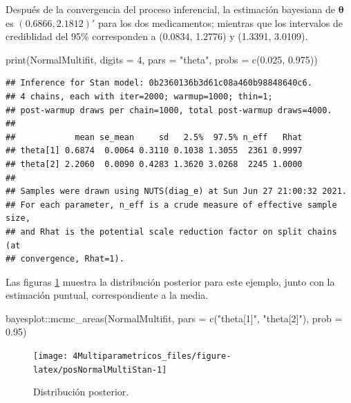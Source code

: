\documentclass[
  10pt,
  spanish,
]{book}
\newenvironment{Shaded}{\begin{snugshade}}{\end{snugshade}}
\newcommand{\AttributeTok}[1]{\textcolor[rgb]{0.77,0.63,0.00}{#1}}
\newcommand{\DecValTok}[1]{\textcolor[rgb]{0.00,0.00,0.81}{#1}}
\newcommand{\FloatTok}[1]{\textcolor[rgb]{0.00,0.00,0.81}{#1}}
\newcommand{\FunctionTok}[1]{\textcolor[rgb]{0.00,0.00,0.00}{#1}}
\newcommand{\NormalTok}[1]{#1}
\newcommand{\SpecialCharTok}[1]{\textcolor[rgb]{0.00,0.00,0.00}{#1}}
\newcommand{\StringTok}[1]{\textcolor[rgb]{0.31,0.60,0.02}{#1}}
\theoremstyle{definition}
\theoremstyle{definition}
\theoremstyle{definition}
\theoremstyle{definition}
\theoremstyle{remark}
\begin{document}
Después de la convergencia del proceso inferencial, la estimación bayesiana de \(\boldsymbol \theta\) es \((0.6866, 2.1812)'\) para los dos medicamentos; mientras que los intervalos de crediblidad del 95\% corresponden a (0.0834, 1.2776) y (1.3391, 3.0109).

\begin{Shaded}
\begin{Highlighting}[]
\FunctionTok{print}\NormalTok{(NormalMultifit, }\AttributeTok{digits =} \DecValTok{4}\NormalTok{, }
      \AttributeTok{pars =} \StringTok{"theta"}\NormalTok{, }\AttributeTok{probs =} \FunctionTok{c}\NormalTok{(}\FloatTok{0.025}\NormalTok{, }\FloatTok{0.975}\NormalTok{))}
\end{Highlighting}
\end{Shaded}

\begin{verbatim}
## Inference for Stan model: 0b2360136b3d61c08a460b98848640c6.
## 4 chains, each with iter=2000; warmup=1000; thin=1; 
## post-warmup draws per chain=1000, total post-warmup draws=4000.
## 
##            mean se_mean     sd   2.5%  97.5% n_eff   Rhat
## theta[1] 0.6874  0.0064 0.3110 0.1038 1.3055  2361 0.9997
## theta[2] 2.2060  0.0090 0.4283 1.3620 3.0268  2245 1.0000
## 
## Samples were drawn using NUTS(diag_e) at Sun Jun 27 21:00:32 2021.
## For each parameter, n_eff is a crude measure of effective sample size,
## and Rhat is the potential scale reduction factor on split chains (at 
## convergence, Rhat=1).
\end{verbatim}

Las figuras \ref{fig:posNormalMultiStan} muestra la distribución posterior para este ejemplo, junto con la estimación puntual, correspondiente a la media.

\begin{Shaded}
\begin{Highlighting}[]
\NormalTok{bayesplot}\SpecialCharTok{::}\FunctionTok{mcmc\_areas}\NormalTok{(NormalMultifit, }\AttributeTok{pars =} \FunctionTok{c}\NormalTok{(}\StringTok{"theta[1]"}\NormalTok{, }\StringTok{"theta[2]"}\NormalTok{), }
                      \AttributeTok{prob =} \FloatTok{0.95}\NormalTok{)}
\end{Highlighting}
\end{Shaded}

\begin{figure}

{\centering \texttt{[image: 4Multiparametricos\_files/figure-latex/posNormalMultiStan-1]} 

}

\caption{Distribución posterior.}\label{fig:posNormalMultiStan}
\end{figure}
\end{document}
